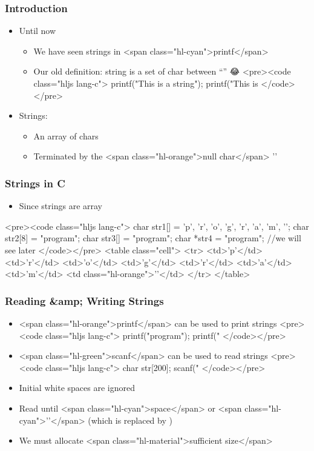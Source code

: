 \documentclass{../c-lecture}
\begin{document}
\begin{frame}
  \frametitle{Introduction}
  \begin{itemize}
    \item Until now
    \begin{itemize}
      \item We have seen strings in <span class="hl-cyan">printf</span>
      \item Our old definition: string is a set of char between “” 😂
      <pre><code class="hljs lang-c">
printf("This is a string\n");
printf("This is %
      </code></pre>
    \end{itemize}
    \item Strings:
    \begin{itemize}
      \item An array of chars
      \item Terminated by the <span class="hl-orange">null char</span> '\0'
    \end{itemize}
  \end{itemize}
\end{frame}
\begin{frame}
  \frametitle{Strings in C}
  \begin{itemize}
    \item Since strings are array
  \end{itemize}
  <pre><code class="hljs lang-c">
char str1[] = {'p', 'r', 'o', 'g', 'r', 'a', 'm', '\0'};
char str2[8] = "program";
char str3[] = "program";
char *str4 = "program"; //we will see later
  </code></pre>
  <table class="cell">
    <tr>
      <td>'p'</td>
      <td>'r'</td>
      <td>'o'</td>
      <td>'g'</td>
      <td>'r'</td>
      <td>'a'</td>
      <td>'m'</td>
      <td class="hl-orange">'\0'</td>
    </tr>
  </table>
\end{frame}
\begin{frame}
  \frametitle{Reading &amp; Writing Strings}
  \begin{itemize}
    \item <span class="hl-orange">printf</span> can be used to print strings
    <pre><code class="hljs lang-c">
printf("program");
printf("%
    </code></pre>
  \end{itemize}
  \begin{itemize}
    \item <span class="hl-green">scanf</span> can be used to read strings
    <pre><code class="hljs lang-c">
char str[200];
scanf("%
    </code></pre>
    \item Initial white spaces are ignored
    \item
      Read until <span class="hl-cyan">space</span> or
      <span class="hl-cyan">'\n'</span> (which is replaced by \0)

    \item We must allocate <span class="hl-material">sufficient size</span>
  \end{itemize}
\end{frame}
\end{document}
